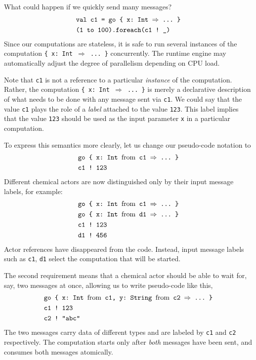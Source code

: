 \documentclass[sigplan,10pt,review,anonymous]{acmart}\settopmatter{printfolios=true}
\begin{document}
What could happen if we quickly send many messages? 
\begin{align*}
\text{} & \texttt{val c1 }\text{\texttt{= go \{ x:~Int \ensuremath{\Rightarrow} ...~\}}}\\
 & \text{\texttt{(1 to 100).foreach(c1 !~\_) }}
\end{align*}
Since our computations are stateless, it is safe to run several instances
of the computation \texttt{\{ x: Int $\Rightarrow$ ...~\}} concurrently.
The runtime engine may automatically adjust the degree of parallelism
depending on CPU load.

Note that \texttt{c1} is not a reference to a particular \emph{instance}
of the computation. Rather, the computation \texttt{\{ x: Int $\Rightarrow$
...~\}} is merely a declarative description of what needs to be done
with any message sent via \texttt{c1}. We could say that the value
\texttt{c1} plays the role of a \emph{label} attached to the value
\texttt{123}. This label implies that the value \texttt{123} should
be used as the input parameter \texttt{x} in a particular computation. 

To express this semantics more clearly, let us change our pseudo-code
notation to 
\begin{align*}
\text{} & \text{\texttt{go \{ x:~Int \textnormal{from} c1 \ensuremath{\Rightarrow} ...~\}}}\\
 & \text{\texttt{c1 !~123 }}
\end{align*}
Different chemical actors are now distinguished only by their input
message labels, for example:
\begin{align*}
\text{} & \text{\texttt{go \{ x:~Int \textnormal{from} c1 \ensuremath{\Rightarrow} ...~\}}}\\
\text{} & \text{\texttt{go \{ x:~Int \textnormal{from} d1 \ensuremath{\Rightarrow} ...~\}}}\\
 & \text{\texttt{c1 !~123 }}\\
 & \text{\texttt{d1 !~456 }}
\end{align*}
Actor references have disappeared from the code. Instead, input message
labels such as \texttt{c1}, \texttt{d1} select the computation that
will be started.

The second requirement means that a chemical actor should be able
to wait for, say, two messages at once, allowing us to write pseudo-code
like this, 
\begin{align*}
\text{} & \text{\texttt{go \{ x:~Int \textnormal{from} c1, y:~String \textnormal{from} c2 \ensuremath{\Rightarrow} ...~\}}}\\
 & \text{\texttt{c1 !~123}}\\
 & \text{\texttt{c2 !~"abc"}}
\end{align*}
The two messages carry data of different types and are labeled by
\texttt{c1} and \texttt{c2} respectively. The computation starts only
after \emph{both} messages have been sent, and consumes both messages
atomically.
\end{document}
